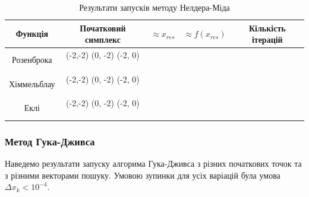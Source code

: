 \begin{table}[h!]
    \centering
    \begin{tabular}{|c|c|c|c|c|}
        \hline
        \textbf{Функція} & \textbf{Початковий симплекс} & $\approx x_{res}$ & $\approx f(x_{res})$ & \textbf{Кількість ітерацій}  \\
        \hline
        \multirow{4}{*}{Розенброка} & (-2,-2) (0, -2) (-2, 0) & & &  \\
        \cline{2-5}
        & & & &
        \\ \cline{2-5}
        & & & &
        \\ \cline{2-5}
        & & & &
        \\ \hline
        \multirow{4}{*}{Хіммельблау} & (-2,-2) (0, -2) (-2, 0) & & &  \\
        \cline{2-5}
        & & & &
        \\ \cline{2-5}
        & & & &
        \\ \cline{2-5}
        & & & &
        \\ \hline
        \multirow{4}{*}{Еклі} & (-2,-2) (0, -2) (-2, 0) & & &  \\
        \cline{2-5}
        & & & &
        \\ \cline{2-5}
        & & & &
        \\ \cline{2-5}
        & & & &
        \\ \hline
    \end{tabular}
    \caption{Результати запусків методу Нелдера-Міда}
\end{table}

\subsubsection*{Метод Гука-Дживса}

Наведемо результати запуску алгорима Гука-Дживса
з різних початкових точок та з різними векторами пошуку.
Умовою зупинки для усіх варіацій була умова $\Delta x_k < 10^{-4}$.

